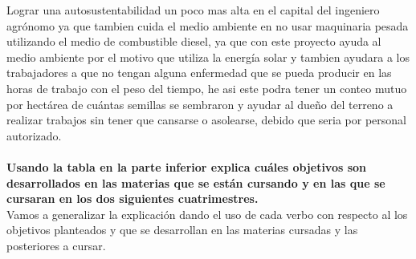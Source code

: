 \documentclass[11pt,a4paper]{article}
\begin{document}
Lograr una autosustentabilidad un poco mas alta en el capital del ingeniero agrónomo ya que tambien cuida el medio ambiente en no usar maquinaria pesada utilizando el medio de combustible diesel, ya que con este proyecto ayuda al medio ambiente por el motivo que utiliza la energía solar y tambien ayudara a los trabajadores a que no tengan alguna enfermedad que se pueda producir en las horas de trabajo con el peso del tiempo, he asi este podra tener un conteo mutuo por hectárea de cuántas semillas se sembraron y ayudar al dueño del terreno a realizar trabajos sin tener que cansarse o asolearse, debido que seria por personal autorizado.\\\\
\textbf{Usando la tabla en la parte inferior explica cuáles objetivos son desarrollados en las materias que se están cursando y en las que se cursaran en los dos siguientes cuatrimestres.}\\
Vamos a generalizar la explicación dando el uso de cada verbo con respecto al los objetivos planteados y que se desarrollan en las materias cursadas y las posteriores a cursar.\\\\
\end{document}
